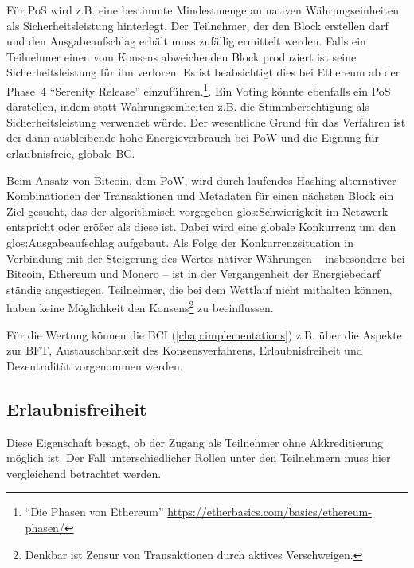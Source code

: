 Für \gls{PoS} wird z.B. eine bestimmte Mindestmenge an nativen Währungseinheiten als Sicherheitsleistung hinterlegt.
Der Teilnehmer, der den Block erstellen darf und den Ausgabeaufschlag erhält muss zufällig ermittelt werden.
Falls ein Teilnehmer einen vom Konsens abweichenden Block produziert ist seine Sicherheitsleistung für ihn verloren.
Es ist beabsichtigt dies bei Ethereum ab der Phase~4 \enquote{Serenity Release} einzuführen.\footnote{\enquote{Die Phasen von Ethereum} \url{https://etherbasics.com/basics/ethereum-phasen/}}.
Ein Voting könnte ebenfalls ein \gls{PoS} darstellen, indem statt Währungseinheiten z.B. die Stimmberechtigung als Sicherheitsleistung verwendet würde.
Der wesentliche Grund für das Verfahren ist der dann ausbleibende hohe Energieverbrauch bei \gls{PoW} und die Eignung für erlaubnisfreie, globale \gls{BC}.

Beim Ansatz von Bitcoin, dem \gls{PoW}, wird durch laufendes Hashing alternativer Kombinationen der Transaktionen und Metadaten für einen nächsten Block ein Ziel gesucht, das der algorithmisch vorgegeben \gls{glos:Schwierigkeit} im Netzwerk entspricht oder größer als diese ist.
Dabei wird eine globale Konkurrenz um den \gls{glos:Ausgabeaufschlag} aufgebaut.
Als Folge der Konkurrenzsituation in Verbindung mit der Steigerung des Wertes nativer Währungen -- insbesondere bei Bitcoin, Ethereum und Monero -- ist in der Vergangenheit der Energiebedarf ständig angestiegen.
Teilnehmer, die bei dem Wettlauf nicht mithalten können, haben keine Möglichkeit den Konsens\footnote{Denkbar ist Zensur von Transaktionen durch aktives Verschweigen.} zu beeinflussen.

Für die Wertung können die \gls{BCI} (\ref{chap:implementations}) z.B. über die Aspekte zur \gls{BFT}, Austauschbarkeit des Konsensverfahrens, Erlaubnisfreiheit und Dezentralität vorgenommen werden.

\subsection{Erlaubnisfreiheit}\label{krit:erlaubnisfreiheit}

Diese Eigenschaft besagt, ob der Zugang als Teilnehmer ohne Akkreditierung möglich ist.
Der Fall unterschiedlicher Rollen unter den Teilnehmern muss hier vergleichend betrachtet werden.


